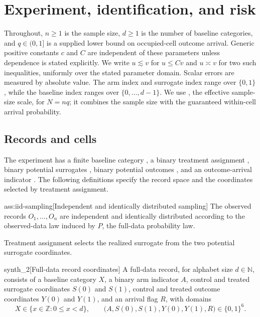 \documentclass[11pt]{article}
\begin{document}
\section{Experiment, identification, and risk}

Throughout, \(n\ge1\) is the sample size, \(d\ge1\) is the number of baseline categories, and \(q\in(0,1]\) is a supplied lower bound on occupied-cell outcome arrival. Generic positive constants \(c\) and \(C\) are independent of these parameters unless dependence is stated explicitly. We write \(u\lesssim v\) for \(u\le Cv\) and \(u\asymp v\) for two such inequalities, uniformly over the stated parameter domain. Scalar errors are measured by absolute value. The arm index  and surrogate index  range over \(\{0,1\}\), while the baseline index  ranges over \(\{0,\ldots,d-1\}\). We use , the effective sample-size scale, for \(N=nq\); it combines the sample size with the guaranteed within-cell arrival probability.

\subsection{Records and cells}

The experiment has a finite baseline category , a binary treatment assignment , binary potential surrogates , binary potential outcomes , and an outcome-arrival indicator . The following definitions specify the record space and the coordinates selected by treatment assignment.

\begin{assumptionv}{ass:iid-sampling}[Independent and identically distributed sampling]
The observed records \(O_1,\ldots,O_n\) are independent and identically distributed according to the observed-data law induced by \(P\), the full-data probability law.
\end{assumptionv}

Treatment assignment selects the realized surrogate  from the two potential surrogate coordinates.

\begin{definitionv}{synth_2}[Full-data record coordinates]
A full-data record, for alphabet size \(d\in\mathbb N\), consists of a baseline category \(X\), a binary arm indicator \(A\), control and treated surrogate coordinates \(S(0)\) and \(S(1)\), control and treated outcome coordinates \(Y(0)\) and \(Y(1)\), and an arrival flag \(R\), with domains
\[
X\in\{x\in\mathbb Z:0\le x<d\},
\qquad
\bigl(A,S(0),S(1),Y(0),Y(1),R\bigr)\in\{0,1\}^{6}.
\]
\end{definitionv}
\end{document}
